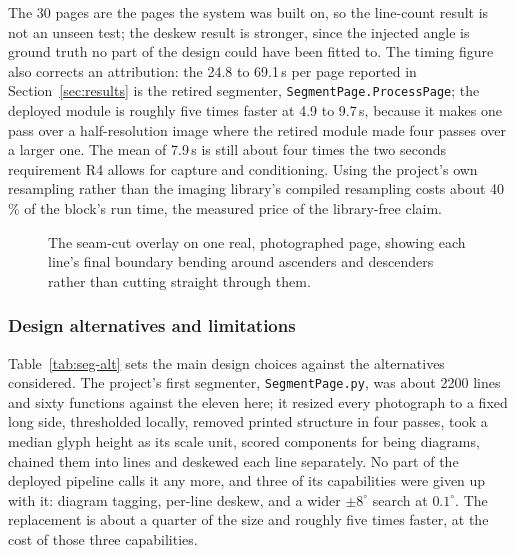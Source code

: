 The 30 pages are the pages the system was built on, so the line-count result is not an unseen test; the deskew result is stronger, since the injected angle is ground truth no part of the design could have been fitted to. The timing figure also corrects an attribution: the 24.8 to 69.1\,s per page reported in Section~\ref{sec:results} is the retired segmenter, \texttt{SegmentPage.ProcessPage}; the deployed module is roughly five times faster at 4.9 to 9.7\,s, because it makes one pass over a half-resolution image where the retired module made four passes over a larger one. The mean of 7.9\,s is still about four times the two seconds requirement R4 allows for capture and conditioning. Using the project's own resampling rather than the imaging library's compiled resampling costs about 40\,\% of the block's run time, the measured price of the library-free claim.

\begin{figure}[htb]
\centering
{}
\caption{The seam-cut overlay on one real, photographed page, showing each line's final boundary bending around ascenders and descenders rather than cutting straight through them.}
\label{fig:seg-cuts}
\end{figure}

\subsubsection{Design alternatives and limitations}

Table~\ref{tab:seg-alt} sets the main design choices against the alternatives considered. The project's first segmenter, \texttt{SegmentPage.py}, was about 2200 lines and sixty functions against the eleven here; it resized every photograph to a fixed long side, thresholded locally, removed printed structure in four passes, took a median glyph height as its scale unit, scored components for being diagrams, chained them into lines and deskewed each line separately. No part of the deployed pipeline calls it any more, and three of its capabilities were given up with it: diagram tagging, per-line deskew, and a wider $\pm8^\circ$ search at $0.1^\circ$. The replacement is about a quarter of the size and roughly five times faster, at the cost of those three capabilities.

